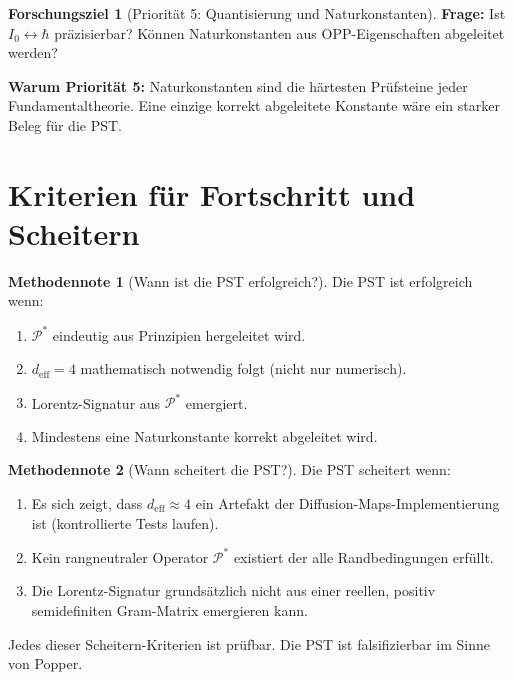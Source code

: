 \documentclass[11pt,a4paper]{article}
\theoremstyle{plain}
\theoremstyle{definition}
\newtheorem{methodennote}{Methodennote}[section]
\newtheorem{ziel}{Forschungsziel}[section]
\newcommand{\deff}{d_{\mathrm{eff}}}
\newcommand{\Proj}{\mathcal{P}}
\begin{document}
\begin{ziel}[Priorit\"{a}t 5: Quantisierung und Naturkonstanten]
\textbf{Frage:} Ist $I_0 \leftrightarrow \hbar$ pr\"{a}zisierbar?
K\"{o}nnen Naturkonstanten aus OPP-Eigenschaften abgeleitet werden?

\textbf{Warum Priorit\"{a}t 5:} Naturkonstanten sind die h\"{a}rtesten
Pr\"{u}fsteine jeder Fundamentaltheorie. Eine einzige korrekt abgeleitete
Konstante w\"{a}re ein starker Beleg f\"{u}r die PST.
\end{ziel}

\section{Kriterien f\"{u}r Fortschritt und Scheitern}

\begin{methodennote}[Wann ist die PST erfolgreich?]
Die PST ist erfolgreich wenn:
\begin{enumerate}
  \item $\Proj^\ast$ eindeutig aus Prinzipien hergeleitet wird.
  \item $\deff = 4$ mathematisch notwendig folgt (nicht nur numerisch).
  \item Lorentz-Signatur aus $\Proj^\ast$ emergiert.
  \item Mindestens eine Naturkonstante korrekt abgeleitet wird.
\end{enumerate}
\end{methodennote}

\begin{methodennote}[Wann scheitert die PST?]
Die PST scheitert wenn:
\begin{enumerate}
  \item Es sich zeigt, dass $\deff \approx 4$ ein Artefakt der
        Diffusion-Maps-Implementierung ist (kontrollierte Tests laufen).
  \item Kein rangneutraler Operator $\Proj^\ast$ existiert der alle
        Randbedingungen erf\"{u}llt.
  \item Die Lorentz-Signatur grundsätzlich nicht aus einer reellen,
        positiv semidefiniten Gram-Matrix emergieren kann.
\end{enumerate}
Jedes dieser Scheitern-Kriterien ist pr\"{u}fbar. Die PST ist falsifizierbar
im Sinne von Popper.
\end{methodennote}
\end{document}
